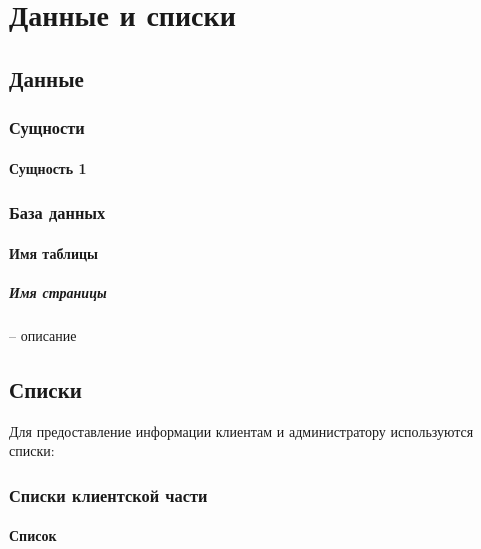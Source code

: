 \section{Данные и списки}

\subsection{Данные}

\subsubsection{Сущности}
\paragraph{Сущность 1}

\subsubsection{База данных}
\paragraph{Имя таблицы}
\subparagraph{Имя страницы} -- описание

\subsection{Списки}
Для предоставление информации клиентам и администратору используются списки:
\subsubsection{Списки клиентской части}
\paragraph{Список}
